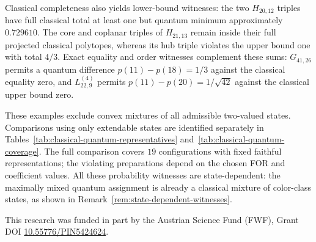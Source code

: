 \documentclass[aps,pra,reprint,superscriptaddress,longbibliography,nofootinbib,floatfix,10pt]{revtex4-2}
\theoremstyle{definition}\newtheorem{definition}[theorem]{Definition}
\theoremstyle{remark}\newtheorem{remark}[theorem]{Remark}
\begin{document}
Classical completeness also yields lower-bound witnesses: the two $H_{20,12}$ triples have full classical total at least one but quantum minimum approximately $0.729610$. The core and coplanar triples of $H_{21,13}$ remain inside their full projected classical polytopes, whereas its hub triple violates the upper bound one with total $4/3$. Exact equality and order witnesses complement these sums: $G_{41,26}$ permits a quantum difference $p(11)-p(18)=1/3$ against the classical equality zero, and $L_{22,9}^{(4)}$ permits $p(11)-p(20)=1/\sqrt{42}$ against the classical upper bound zero.

These examples exclude convex mixtures of all admissible two-valued states. Comparisons using only extendable states are identified separately in Tables~\ref{tab:classical-quantum-representatives} and~\ref{tab:classical-quantum-coverage}. The full comparison covers $19$ configurations with fixed faithful representations; the violating preparations depend on the chosen FOR and coefficient values. All these probability witnesses are state-dependent: the maximally mixed quantum assignment is already a classical mixture of color-class states, as shown in Remark~\ref{rem:state-dependent-witnesses}.

\begin{acknowledgments}
This research was funded in part by the Austrian Science Fund (FWF), Grant DOI \href{https://doi.org/10.55776/PIN5424624}{10.55776/PIN5424624}.
\end{acknowledgments}


\end{document}
